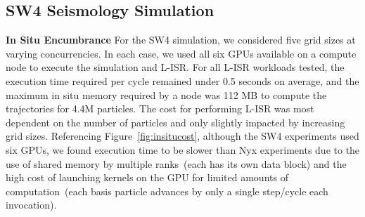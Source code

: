 \vspace{-1mm}
\subsection{SW4 Seismology Simulation}
\label{sec:sw4}
\noindent\textbf{In Situ Encumbrance}
For the SW4 simulation, we considered five grid sizes at varying concurrencies.
%
In each case, we used all six GPUs available on a compute node to execute the simulation and L-ISR.
%
For all L-ISR workloads tested, the execution time required per cycle remained under 0.5 seconds on average, and the maximum in situ memory required by a node was 112 MB to compute the trajectories for 4.4M particles.
%
The cost for performing L-ISR was most dependent on the number of particles and only slightly impacted by increasing grid sizes.
%
%
Referencing Figure~\ref{fig:insitucost}, although the SW4 experiments used six GPUs, we found execution time to be slower than Nyx experiments due to the use of shared memory by multiple ranks~(each has its own data block) and the high cost of launching kernels on the GPU for limited amounts of computation~(each basis particle advances by only a single step/cycle each invocation). 
%
%
%
%
%
%





